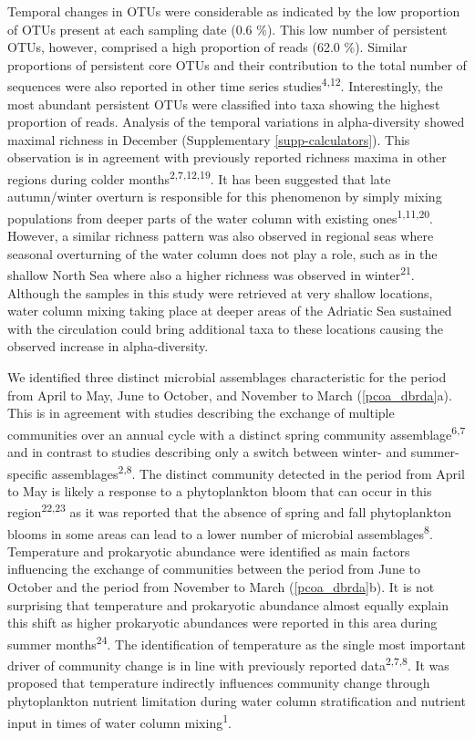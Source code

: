 \documentclass[
  12pt,
]{article}
\begin{document}
Temporal changes in OTUs were considerable as indicated by the low
proportion of OTUs present at each sampling date (0.6 \si{\percent}).
This low number of persistent OTUs, however, comprised a high proportion
of reads (62.0 \si{\percent}). Similar proportions of persistent core
OTUs and their contribution to the total number of sequences were also
reported in other time series studies\textsuperscript{4,12}.
Interestingly, the most abundant persistent OTUs were classified into
taxa showing the highest proportion of reads. Analysis of the temporal
variations in alpha-diversity showed maximal richness in December
(Supplementary \autoref{supp-calculators}). This observation is in
agreement with previously reported richness maxima in other regions
during colder months\textsuperscript{2,7,12,19}. It has been suggested
that late autumn/winter overturn is responsible for this phenomenon by
simply mixing populations from deeper parts of the water column with
existing ones\textsuperscript{1,11,20}. However, a similar richness
pattern was also observed in regional seas where seasonal overturning of
the water column does not play a role, such as in the shallow North Sea
where also a higher richness was observed in winter\textsuperscript{21}.
Although the samples in this study were retrieved at very shallow
locations, water column mixing taking place at deeper areas of the
Adriatic Sea sustained with the circulation could bring additional taxa
to these locations causing the observed increase in alpha-diversity.

We identified three distinct microbial assemblages characteristic for
the period from April to May, June to October, and November to March
(\autoref{pcoa_dbrda}a). This is in agreement with studies describing
the exchange of multiple communities over an annual cycle with a
distinct spring community assemblage\textsuperscript{6,7} and in
contrast to studies describing only a switch between winter- and
summer-specific assemblages\textsuperscript{2,8}. The distinct community
detected in the period from April to May is likely a response to a
phytoplankton bloom that can occur in this region\textsuperscript{22,23}
as it was reported that the absence of spring and fall phytoplankton
blooms in some areas can lead to a lower number of microbial
assemblages\textsuperscript{8}. Temperature and prokaryotic abundance
were identified as main factors influencing the exchange of communities
between the period from June to October and the period from November to
March (\autoref{pcoa_dbrda}b). It is not surprising that temperature and
prokaryotic abundance almost equally explain this shift as higher
prokaryotic abundances were reported in this area during summer
months\textsuperscript{24}. The identification of temperature as the
single most important driver of community change is in line with
previously reported data\textsuperscript{2,7,8}. It was proposed that
temperature indirectly influences community change through phytoplankton
nutrient limitation during water column stratification and nutrient
input in times of water column mixing\textsuperscript{1}.
\end{document}

